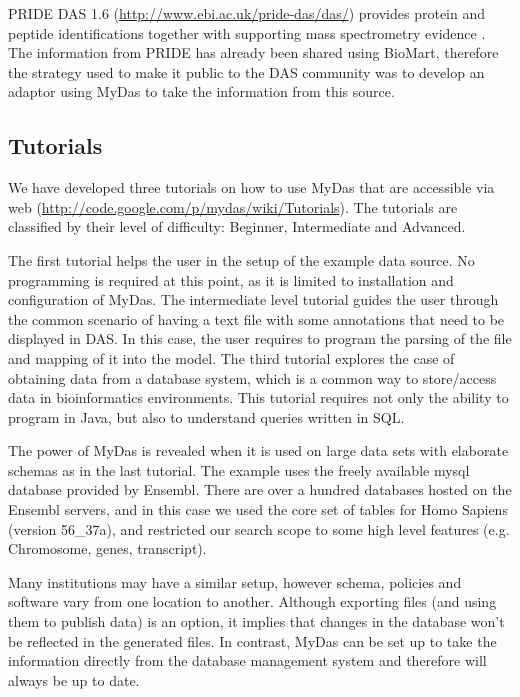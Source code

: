 PRIDE DAS 1.6 (\url{http://www.ebi.ac.uk/pride-das/das/}) provides protein and peptide identifications together with supporting mass spectrometry evidence \cite{VIZ2009}. The information from PRIDE has already been shared using BioMart\cite{KIN2011}, therefore the strategy used to make it public to the DAS community was to develop an adaptor using MyDas to take the information from this source.

\subsection{Tutorials}
We have developed three tutorials on how to use MyDas that are accessible via web (\url{http://code.google.com/p/mydas/wiki/Tutorials}). The tutorials are classified by their level of difficulty: Beginner, Intermediate and Advanced. 

The first tutorial helps the user in the setup of the example data source. No programming is required at this point, as it is limited to installation and configuration of MyDas. The intermediate level tutorial guides the user through the common scenario of having a text file with some annotations that need to be displayed in DAS. In this case, the user requires to program the parsing of the file and mapping of it into the model. The third tutorial explores the case of obtaining data from a database system, which is a common way to store/access data in bioinformatics environments. This tutorial requires not only the ability to program in Java, but also to understand queries written in SQL.

The power of MyDas is revealed when it is used on large data sets with elaborate schemas as in the last tutorial. The example uses the freely available mysql database provided by Ensembl. There are over a hundred databases hosted on the Ensembl servers, and in this case we used the core set of tables for Homo Sapiens (version 56\_37a), and restricted our search scope to some high level features (e.g. Chromosome, genes, transcript). 

Many institutions may have a similar setup, however schema, policies and software vary from one location to another. Although exporting files (and using them to publish data) is an option, it implies that changes in the database won't be reflected in the generated files. In contrast, MyDas can be set up to take the information directly from the database management system and therefore will always be up to date.

